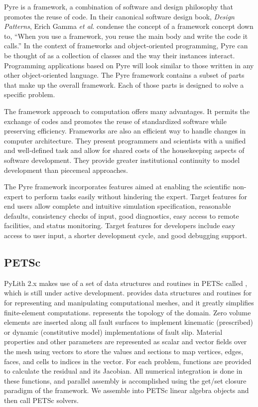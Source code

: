 Pyre is a framework, a combination of software and design philosophy
that promotes the reuse of code. In their canonical software design
book, \emph{Design Patterns}, Erich Gamma \textit{et al}. condense
the concept of a framework concept down to, ``When you use a framework,
you reuse the main body and write the code it calls.'' In the context
of frameworks and object-oriented programming, Pyre can be thought
of as a collection of classes and the way their instances interact.
Programming applications based on Pyre will look similar to those
written in any other object-oriented language. The Pyre framework
contains a subset of parts that make up the overall framework. Each
of those parts is designed to solve a specific problem.

The framework approach to computation offers many advantages. It permits
the exchange of codes and promotes the reuse of standardized software
while preserving efficiency. Frameworks are also an efficient way
to handle changes in computer architecture. They present programmers
and scientists with a unified and well-defined task and allow for
shared costs of the housekeeping aspects of software development.
They provide greater institutional continuity to model development
than piecemeal approaches.

The Pyre framework incorporates features aimed at enabling the
scientific non-expert to perform tasks easily without hindering the
expert. Target features for end users allow complete and intuitive
simulation specification, reasonable defaults, consistency checks of
input, good diagnostics, easy access to remote facilities, and status
monitoring. Target features for developers include easy access to user
input, a shorter development cycle, and good debugging support.


\subsection{PETSc}

PyLith 2.x makes use of a set of data structures and routines in PETSc
called , which is still under active
development.  provides data structures and routines for
for representing and manipulating computational meshes, and it greatly
simplifies finite-element computations. represents the
topology of the domain. Zero volume elements are inserted along all
fault surfaces to implement kinematic (prescribed) or dynamic
(constitutive model) implementations of fault slip. Material
properties and other parameters are represented as scalar and vector
fields over the mesh using vectors to store the values and sections to
map vertices, edges, faces, and cells to indices in the vector. For
each problem, functions are provided to calculate the residual and its
Jacobian.  All numerical integration is done in these functions, and
parallel assembly is accomplished using the get/set closure paradigm
of the  framework. We assemble into PETSc linear
algebra objects and then call PETSc solvers.

